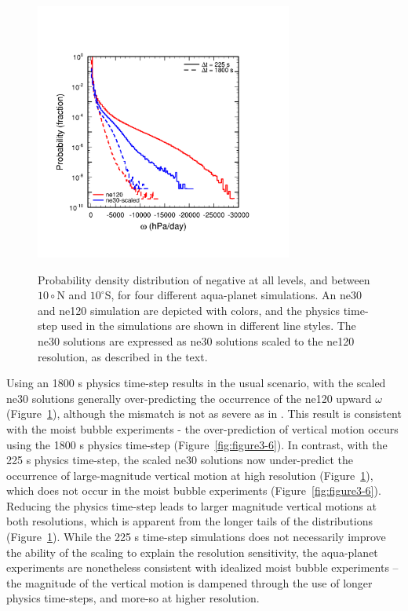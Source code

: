 \begin{figure}
\begin{center}
\noindent\includegraphics[width=20pc,angle=0]{chapter3/Figure10_crop.pdf}\\
\end{center}
\caption{Probability density distribution of negative  at all levels, and between $10{\circ}$N and $10^{\circ}$S, for four different aqua-planet simulations. An ne30 and ne120 simulation are depicted with colors, and the physics time-step used in the simulations are shown in different line styles. The ne30 solutions are expressed as ne30 solutions scaled to the ne120 resolution, as described in the text.}
\label{fig:figure3-10}
\end{figure}

Using an 1800 s physics time-step results in the usual scenario, with the scaled ne30 solutions generally over-predicting the occurrence of the ne120 upward  $\omega$ (Figure~\ref{fig:figure3-10}), although the mismatch is not as severe as in \cite{HR2017JCLIM}. This result is consistent with the moist bubble experiments - the over-prediction of vertical motion occurs using the 1800 s physics time-step (Figure~\ref{fig:figure3-6}). In contrast, with the 225 s physics time-step, the scaled ne30 solutions now under-predict the occurrence of large-magnitude vertical motion at high resolution (Figure~\ref{fig:figure3-10}), which does not occur in the moist bubble experiments (Figure~\ref{fig:figure3-6}). Reducing the physics time-step leads to larger magnitude vertical motions at both resolutions, which is apparent from the longer tails of the distributions (Figure~\ref{fig:figure3-10}). While the 225 s time-step simulations does not necessarily improve the ability of the scaling to explain the resolution sensitivity, the aqua-planet experiments are nonetheless consistent with idealized moist bubble experiments – the magnitude of the vertical motion is dampened through the use of longer physics time-steps, and more-so at higher resolution. 

